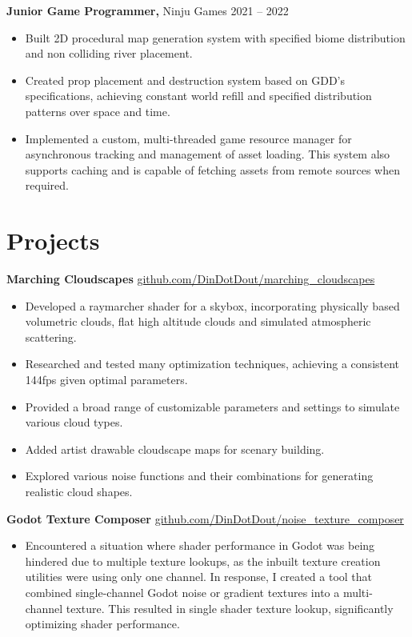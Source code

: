 \documentclass[10pt]{article}       %
\begin{document}
\textbf{Junior Game Programmer,}  {Ninju Games} \hfill 2021 -- 2022 \\
\vspace{-9pt}
\begin{itemize}
	\item Built 2D procedural map generation system with specified biome distribution and non colliding river placement.
	\item Created prop placement and destruction system based on GDD's specifications, achieving constant world refill and specified distribution patterns over space and time.
	\item Implemented a custom, multi-threaded game resource manager for asynchronous tracking and management of asset loading. This system also supports caching and is capable of fetching assets from remote sources when required.
\end{itemize}

\vspace{-18.5pt}

\section*{Projects}
\textbf{Marching Cloudscapes} \hfill \href{https://github.com/DinDotDout/marching_cloudscapes}{github.com/DinDotDout/marching\_cloudscapes} \\
\vspace{-9pt}
\begin{itemize}
	\item Developed a raymarcher shader for a skybox, incorporating physically based volumetric clouds, flat high altitude clouds and simulated atmospheric scattering.
	\item Researched and tested many optimization techniques, achieving a consistent 144fps given optimal parameters.
	\item Provided a broad range of customizable parameters and settings to simulate various cloud types.
	\item Added artist drawable cloudscape maps for scenary building.
	\item Explored various noise functions and their combinations for generating realistic cloud shapes.
\end{itemize}

\textbf{Godot Texture Composer} \hfill \href{https://github.com/DinDotDout/noise_texture_composer}{github.com/DinDotDout/noise\_texture\_composer} \\
\vspace{-9pt}
\begin{itemize}
	\item Encountered a situation where shader performance in Godot was being hindered due to multiple texture lookups, as the inbuilt texture creation utilities were using only one channel. In response, I created a tool that combined single-channel Godot noise or gradient textures into a multi-channel texture. This resulted in single shader texture lookup, significantly optimizing shader performance.
\end{itemize}
\end{document}
